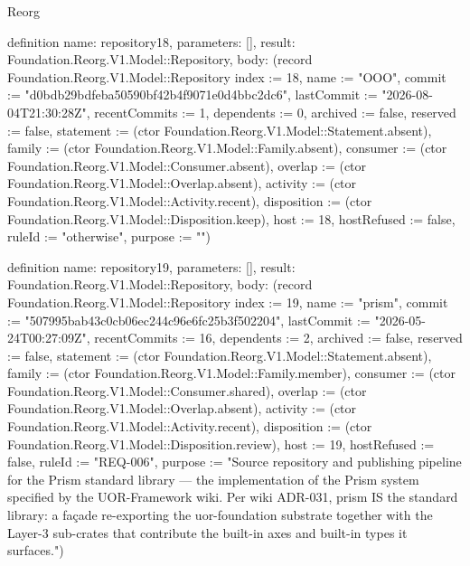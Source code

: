 \begin{lexlean}{Reorg}
\begin{semanticmodule}
definition{
  name: repository18,
  parameters: [],
  result: Foundation.Reorg.V1.Model::Repository,
  body: (record Foundation.Reorg.V1.Model::Repository {index := 18, name := "OOO", commit := "d0bdb29bdfeba50590bf42b4f9071e0d4bbc2dc6", lastCommit := "2026-08-04T21:30:28Z", recentCommits := 1, dependents := 0, archived := false, reserved := false, statement := (ctor Foundation.Reorg.V1.Model::Statement.absent), family := (ctor Foundation.Reorg.V1.Model::Family.absent), consumer := (ctor Foundation.Reorg.V1.Model::Consumer.absent), overlap := (ctor Foundation.Reorg.V1.Model::Overlap.absent), activity := (ctor Foundation.Reorg.V1.Model::Activity.recent), disposition := (ctor Foundation.Reorg.V1.Model::Disposition.keep), host := 18, hostRefused := false, ruleId := "otherwise", purpose := ""})
}

definition{
  name: repository19,
  parameters: [],
  result: Foundation.Reorg.V1.Model::Repository,
  body: (record Foundation.Reorg.V1.Model::Repository {index := 19, name := "prism", commit := "507995bab43c0cb06ec244c96e6fc25b3f502204", lastCommit := "2026-05-24T00:27:09Z", recentCommits := 16, dependents := 2, archived := false, reserved := false, statement := (ctor Foundation.Reorg.V1.Model::Statement.absent), family := (ctor Foundation.Reorg.V1.Model::Family.member), consumer := (ctor Foundation.Reorg.V1.Model::Consumer.shared), overlap := (ctor Foundation.Reorg.V1.Model::Overlap.absent), activity := (ctor Foundation.Reorg.V1.Model::Activity.recent), disposition := (ctor Foundation.Reorg.V1.Model::Disposition.review), host := 19, hostRefused := false, ruleId := "REQ-006", purpose := "Source repository and publishing pipeline for the Prism standard library — the implementation of the Prism system specified by the UOR-Framework wiki. Per wiki ADR-031, prism IS the standard library: a façade re-exporting the uor-foundation substrate together with the Layer-3 sub-crates that contribute the built-in axes and built-in types it surfaces."})
}


\end{semanticmodule}
\end{lexlean}
